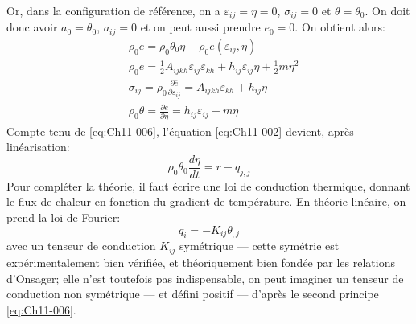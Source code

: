 Or, dans la configuration de référence, on a $\varepsilon_{ij}=\eta=0$, $\sigma_{ij}=0$ et $\theta=\theta_0$.
On doit donc avoir $a_0 = \theta_0$, $a_{ij}=0$ et on peut aussi prendre $e_0=0$.
On obtient alors: 
\begin{subequations}
  \begin{align}
   & \rho_0 e  = \rho_0 \theta_0 \eta + \rho_0 \bar{e}(\varepsilon_{ij},\eta)\label{eq:Ch11-010} \\
   &\rho_0 \bar{e} = \frac{1}{2} A_{ijkh} \varepsilon_{ij}\varepsilon_{kh} + h_{ij} \varepsilon_{ij}\eta + \frac{1}{2} m \eta^2\\
&    \sigma_{ij} = \rho_0 \frac{\partial \bar{e}}{\partial \varepsilon_{ij}} = A_{ijkh} \varepsilon_{kh} + h_{ij} \eta \\ &\rho_0 \bar{\theta} = \frac{\partial \bar{e}}{\partial \eta} = h_{ij} \varepsilon_{ij} + m \eta
  \label{eq:Ch11-011}
\end{align}
\end{subequations}
Compte-tenu de \eqref{eq:Ch11-006}, l'équation \eqref{eq:Ch11-002} devient, après linéarisation: 
\begin{equation}
    \rho_0 \theta_0 \frac{d \eta}{dt} = r - q_{j,j}
    \label{eq:Ch11-012}
\end{equation}
Pour compléter la théorie, il faut écrire une loi de conduction thermique, donnant le flux de chaleur en fonction du gradient de température.
En théorie linéaire, on prend la loi de Fourier: 
\begin{equation}
    q_i = -K_{ij} \theta_{,j}
    \label{eq:Ch11-013}
\end{equation}
avec un tenseur de conduction $K_{ij}$ symétrique --- cette symétrie est expérimentalement bien vérifiée, et théoriquement bien fondée par les relations d'Onsager; elle n'est toutefois pas indispensable, on peut imaginer un tenseur de conduction non symétrique --- et défini positif --- d'après le second principe \eqref{eq:Ch11-006}.

